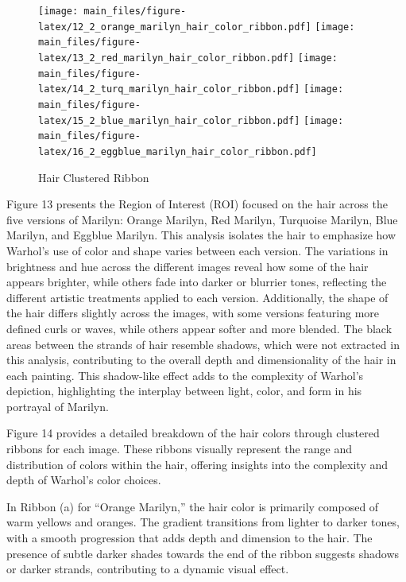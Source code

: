 \documentclass{article}
\begin{document}
\begin{figure}[htbp]
    \centering
        {\texttt{[image: main\_files/figure-latex/12\_2\_orange\_marilyn\_hair\_color\_ribbon.pdf]}}
        {\texttt{[image: main\_files/figure-latex/13\_2\_red\_marilyn\_hair\_color\_ribbon.pdf]}}
        {\texttt{[image: main\_files/figure-latex/14\_2\_turq\_marilyn\_hair\_color\_ribbon.pdf]}}
        {\texttt{[image: main\_files/figure-latex/15\_2\_blue\_marilyn\_hair\_color\_ribbon.pdf]}}
        {\texttt{[image: main\_files/figure-latex/16\_2\_eggblue\_marilyn\_hair\_color\_ribbon.pdf]}}
    \caption{Hair Clustered Ribbon}
\end{figure}

Figure 13 presents the Region of Interest (ROI) focused on the hair
across the five versions of Marilyn: Orange Marilyn, Red Marilyn,
Turquoise Marilyn, Blue Marilyn, and Eggblue Marilyn. This analysis
isolates the hair to emphasize how Warhol's use of color and shape
varies between each version. The variations in brightness and hue across
the different images reveal how some of the hair appears brighter, while
others fade into darker or blurrier tones, reflecting the different
artistic treatments applied to each version. Additionally, the shape of
the hair differs slightly across the images, with some versions
featuring more defined curls or waves, while others appear softer and
more blended. The black areas between the strands of hair resemble
shadows, which were not extracted in this analysis, contributing to the
overall depth and dimensionality of the hair in each painting. This
shadow-like effect adds to the complexity of Warhol's depiction,
highlighting the interplay between light, color, and form in his
portrayal of Marilyn.

Figure 14 provides a detailed breakdown of the hair colors through
clustered ribbons for each image. These ribbons visually represent the
range and distribution of colors within the hair, offering insights into
the complexity and depth of Warhol's color choices.

In Ribbon (a) for ``Orange Marilyn,'' the hair color is primarily
composed of warm yellows and oranges. The gradient transitions from
lighter to darker tones, with a smooth progression that adds depth and
dimension to the hair. The presence of subtle darker shades towards the
end of the ribbon suggests shadows or darker strands, contributing to a
dynamic visual effect.
\end{document}
